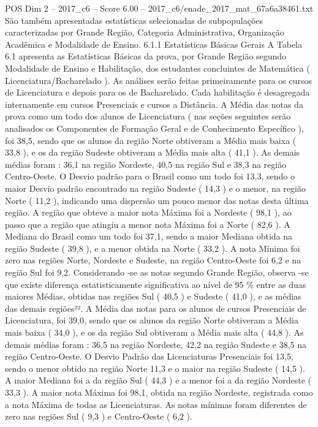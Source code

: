 \begin{textsample}{POS Dim 2 – 2017\_c6 – Score 6.00 – 2017\_c6/enade\_2017\_mat\_67a6a38461.txt}
São também apresentadas estatísticas selecionadas de subpopulações caracterizadas por Grande Região, Categoria Administrativa, Organização Acadêmica e Modalidade de Ensino. 6.1.1 Estatísticas Básicas Gerais A Tabela 6.1 apresenta as Estatísticas Básicas da prova, por Grande Região segundo Modalidade de Ensino e Habilitação, dos estudantes concluintes de Matemática ( Licenciatura/Bacharelado ).
As análises serão feitas primeiramente para os cursos de Licenciatura e depois para os de Bacharelado.
Cada habilitação é desagregada internamente em cursos Presenciais e cursos a Distância.
A Média das notas da prova como um todo dos alunos de Licenciatura ( nas seções seguintes serão analisados os Componentes de Formação Geral e de Conhecimento Específico ), foi 38,5, sendo que os alunos da região Norte obtiveram a Média mais baixa ( 33,8 ), e os da região Sudeste obtiveram a Média mais alta ( 41,1 ).
As demais médias foram : 36,1 na região Nordeste, 40,5 na região Sul e 38,3 na região Centro-Oeste.
O Desvio padrão para o Brasil como um todo foi 13,3, sendo o maior Desvio padrão encontrado na região Sudeste ( 14,3 ) e o menor, na região Norte ( 11,2 ), indicando uma dispersão um pouco menor das notas desta última região.
A região que obteve a maior nota Máxima foi a Nordeste ( 98,1 ), ao passo que a região que atingiu a menor nota Máxima foi a Norte ( 82,6 ).
A Mediana do Brasil como um todo foi 37,1, sendo a maior Mediana obtida na região Sudeste ( 39,8 ), e a menor obtida na Norte ( 33,2 ).
A nota Mínima foi zero nas regiões Norte, Nordeste e Sudeste, na região Centro-Oeste foi 6,2 e na região Sul foi 9,2.
Considerando -se as notas segundo Grande Região, observa -se que existe diferença estatisticamente significativa ao nível de 95 \% entre as duas maiores Médias, obtidas nas regiões Sul ( 40,5 ) e Sudeste ( 41,0 ), e as médias das demais regiões²².
A Média das notas para os alunos de cursos Presenciais de Licenciatura, foi 39,0, sendo que os alunos da região Norte obtiveram a Média mais baixa ( 34,0 ), e os da região Sul obtiveram a Média mais alta ( 44,8 ).
As demais médias foram : 36,5 na região Nordeste, 42,2 na região Sudeste e 38,5 na região Centro-Oeste.
O Desvio Padrão das Licenciaturas Presenciais foi 13,5, sendo o menor obtido na região Norte 11,3 e o maior na região Sudeste ( 14,5 ).
A maior Mediana foi a da região Sul ( 44,3 ) e a menor foi a da região Nordeste ( 33,3 ).
A maior nota Máxima foi 98,1, obtida na região Nordeste, registrada como a nota Máxima de todas as Licenciaturas.
As notas mínimas foram diferentes de zero nas regiões Sul ( 9,3 ) e Centro-Oeste ( 6,2 ).

\end{textsample}
